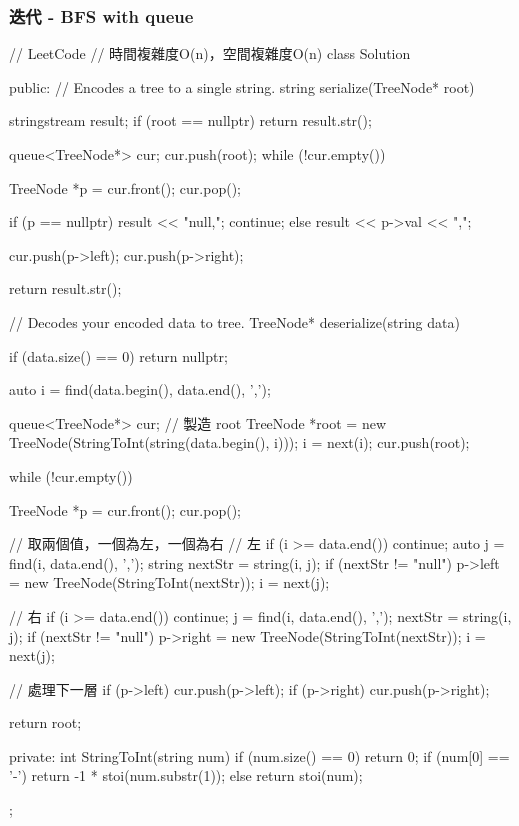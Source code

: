 \subsubsection{迭代 - BFS with queue}
\begin{Code}
// LeetCode
// 時間複雜度O(n)，空間複雜度O(n)
class Solution {
public:
    // Encodes a tree to a single string.
    string serialize(TreeNode* root) {
        stringstream result;
        if (root == nullptr) return result.str();

        queue<TreeNode*> cur;
        cur.push(root);
        while (!cur.empty()) {
            TreeNode *p = cur.front();
            cur.pop();

            if (p == nullptr) {
                result << "null,";
                continue;
            }
            else
                result << p->val << ",";

            cur.push(p->left);
            cur.push(p->right);
        }
        return result.str();
    }

    // Decodes your encoded data to tree.
    TreeNode* deserialize(string data) {
        if (data.size() == 0) return nullptr;

        auto i = find(data.begin(), data.end(), ',');

        queue<TreeNode*> cur;
        // 製造 root
        TreeNode *root = new TreeNode(StringToInt(string(data.begin(), i)));
        i = next(i);
        cur.push(root);

        while (!cur.empty()) {
            TreeNode *p = cur.front();
            cur.pop();

            // 取兩個值，一個為左，一個為右
            // 左
            if (i >= data.end()) continue;
            auto j = find(i, data.end(), ',');
            string nextStr = string(i, j);
            if (nextStr != "null")
                p->left = new TreeNode(StringToInt(nextStr));
            i = next(j);

            // 右
            if (i >= data.end()) continue;
            j = find(i, data.end(), ',');
            nextStr = string(i, j);
            if (nextStr != "null")
                p->right = new TreeNode(StringToInt(nextStr));
            i = next(j);

            // 處理下一層
            if (p->left) cur.push(p->left);
            if (p->right) cur.push(p->right);
        }

        return root;
    }
private:
    int StringToInt(string num) {
        if (num.size() == 0) return 0;
        if (num[0] == '-')
            return -1 * stoi(num.substr(1));
        else
            return stoi(num);
    }
};
\end{Code}



